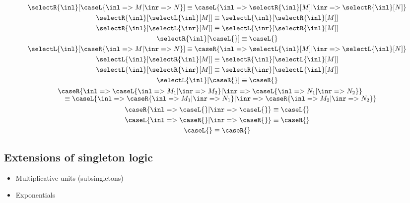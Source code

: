 \begin{gather*}
  \selectR{\inl}[\caseL{\inl => M | \inr => N}] \equiv \caseL{\inl => \selectR{\inl}[M] | \inr => \selectR{\inl}[N]} \\
  \selectR{\inl}[\selectL{\inl}[M]] \equiv \selectL{\inl}[\selectR{\inl}[M]] \\
  \selectR{\inl}[\selectL{\inr}[M]] \equiv \selectL{\inr}[\selectR{\inl}[M]] \\
  \selectR{\inl}[\caseL{}] \equiv \caseL{} \\
  \selectL{\inl}[\caseR{\inl => M | \inr => N}] \equiv \caseR{\inl => \selectL{\inl}[M] | \inr => \selectL{\inl}[N]} \\
  \selectL{\inl}[\selectR{\inl}[M]] \equiv \selectR{\inl}[\selectL{\inl}[M]] \\
  \selectL{\inl}[\selectR{\inr}[M]] \equiv \selectR{\inr}[\selectL{\inl}[M]] \\
  \selectL{\inl}[\caseR{}] \equiv \caseR{} \\
  \begin{lgathered}
    \caseR{\inl => \caseL{\inl => M_1 | \inr => M_2}
         | \inr => \caseL{\inl => N_1 | \inr => N_2}} \\[-1ex]
      \quad \equiv \caseL{\inl => \caseR{\inl => M_1 | \inr => N_1}
                        | \inr => \caseR{\inl => M_2 | \inr => N_2}}
  \end{lgathered}
  \\
  \caseR{\inl => \caseL{} | \inr => \caseL{}} \equiv \caseL{} \\
  \caseL{\inl => \caseR{} | \inr => \caseR{}} \equiv \caseR{} \\
  \caseL{} \equiv \caseR{}
\end{gather*}

\subsection{Extensions of singleton logic}

\begin{itemize}
\item Multiplicative units (subsingletons)
\item Exponentials
\end{itemize}

